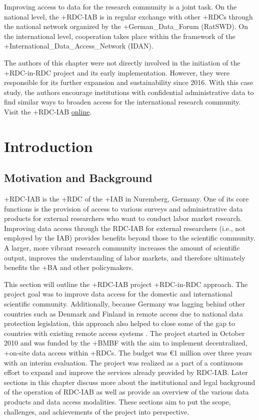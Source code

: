 \documentclass[
]{book}
\begin{document}
Improving access to data for the research community is a joint task. On the national level, the +RDC-IAB\textbar{} is in regular exchange with other +RDC\textbar s through the national network organized by the +German\_Data\_Forum\textbar{} (RatSWD). On the international level, cooperation takes place within the framework of the +International\_Data\_Access\_Network\textbar{} (IDAN).

The authors of this chapter were not directly involved in the initiation of the +RDC-in-RDC\textbar{} project and its early implementation. However, they were responsible for its further expansion and sustainability since 2016. With this case study, the authors encourage institutions with confidential administrative data to find similar ways to broaden access for the international research community. Visit the +RDC-IAB\textbar{} \href{https://fdz.iab.de/en.aspx}{online}.

\hypertarget{introduction-1}{%
\section{Introduction}\label{introduction-1}}

\hypertarget{motivation-and-background}{%
\subsection{Motivation and Background}\label{motivation-and-background}}

+RDC-IAB\textbar{} is the +RDC\textbar{} of the +IAB\textbar{} in Nuremberg, Germany. One of its core functions is the provision of access to various surveys and administrative data products for external researchers who want to conduct labor market research. Improving data access through the RDC-IAB for external researchers (i.e., not employed by the IAB) provides benefits beyond those to the scientific community. A larger, more vibrant research community increases the amount of scientific output, improves the understanding of labor markets, and therefore ultimately benefits the +BA\textbar{} and other policymakers.

This section will outline the +RDC-IAB\textbar{} project +RDC-in-RDC\textbar{} approach. The project goal was to improve data access for the domestic and international scientific community. Additionally, because Germany was lagging behind other countries such as Denmark and Finland in remote access due to national data protection legislation, this approach also helped to close some of the gap to countries with existing remote access systems \citep{bender2011, wirth2019}. The project started in October 2010 and was funded by the +BMBF\textbar{} with the aim to implement decentralized, +on-site\textbar{} data access within +RDC\textbar s. The budget was €1 million over three years with an interim evaluation. The project was realized as a part of a continuous effort to expand and improve the services already provided by RDC-IAB. Later sections in this chapter discuss more about the institutional and legal background of the operation of RDC-IAB as well as provide an overview of the various data products and data access modalities. These sections aim to put the scope, challenges, and achievements of the project into perspective.
\end{document}
